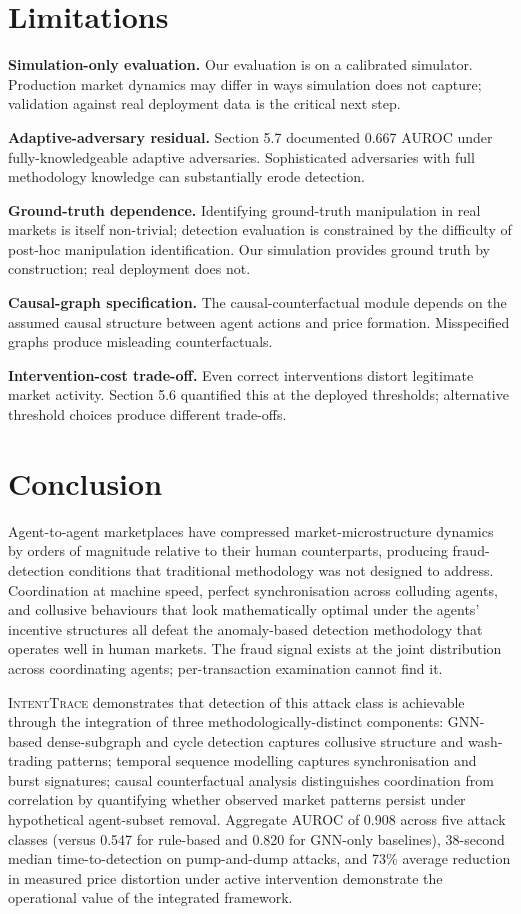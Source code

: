 \documentclass[sigconf,nonacm]{acmart}
\begin{document}
\section{Limitations}

\textbf{Simulation-only evaluation.} Our evaluation is on a
calibrated simulator. Production market dynamics may differ in
ways simulation does not capture; validation against real
deployment data is the critical next step.

\textbf{Adaptive-adversary residual.} Section 5.7 documented
0.667 AUROC under fully-knowledgeable adaptive adversaries.
Sophisticated adversaries with full methodology knowledge can
substantially erode detection.

\textbf{Ground-truth dependence.} Identifying ground-truth
manipulation in real markets is itself non-trivial; detection
evaluation is constrained by the difficulty of post-hoc
manipulation identification. Our simulation provides ground
truth by construction; real deployment does not.

\textbf{Causal-graph specification.} The causal-counterfactual
module depends on the assumed causal structure between agent
actions and price formation. Misspecified graphs produce
misleading counterfactuals.

\textbf{Intervention-cost trade-off.} Even correct interventions
distort legitimate market activity. Section 5.6 quantified this
at the deployed thresholds; alternative threshold choices produce
different trade-offs.

\section{Conclusion}

Agent-to-agent marketplaces have compressed market-microstructure
dynamics by orders of magnitude relative to their human
counterparts, producing fraud-detection conditions that traditional
methodology was not designed to address. Coordination at machine
speed, perfect synchronisation across colluding agents, and
collusive behaviours that look mathematically optimal under the
agents' incentive structures all defeat the anomaly-based
detection methodology that operates well in human markets. The
fraud signal exists at the joint distribution across coordinating
agents; per-transaction examination cannot find it.

\textsc{IntentTrace} demonstrates that detection of this attack
class is achievable through the integration of three
methodologically-distinct components: GNN-based dense-subgraph
and cycle detection captures collusive structure and wash-trading
patterns; temporal sequence modelling captures synchronisation and
burst signatures; causal counterfactual analysis distinguishes
coordination from correlation by quantifying whether observed
market patterns persist under hypothetical agent-subset removal.
Aggregate AUROC of 0.908 across five attack classes (versus 0.547
for rule-based and 0.820 for GNN-only baselines), 38-second
median time-to-detection on pump-and-dump attacks, and 73\%
average reduction in measured price distortion under active
intervention demonstrate the operational value of the integrated
framework.
\end{document}
